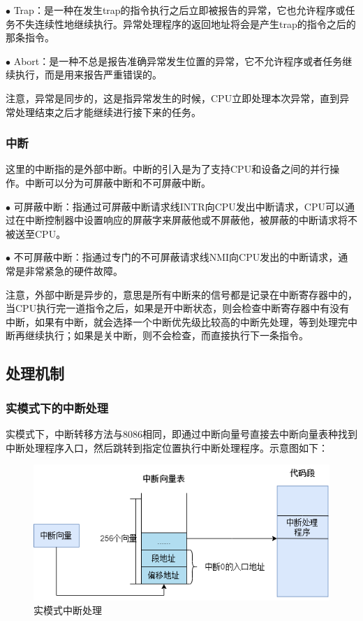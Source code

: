 \documentclass[UTF8,12pt]{ctexart}
\begin{document}
    $\bullet$ Trap：是一种在发生trap的指令执行之后立即被报告的异常，它也允许程序或任务不失连续性地继续执行。异常处理程序的返回地址将会是产生trap的指令之后的那条指令。
    
    $\bullet$ Abort：是一种不总是报告准确异常发生位置的异常，它不允许程序或者任务继续执行，而是用来报告严重错误的。
    
    注意，异常是同步的，这是指异常发生的时候，CPU立即处理本次异常，直到异常处理结束之后才能继续进行接下来的任务。
    
    \subsubsection{中断}
    这里的中断指的是外部中断。中断的引入是为了支持CPU和设备之间的并行操作。中断可以分为可屏蔽中断和不可屏蔽中断。
    
    $\bullet$ 可屏蔽中断：指通过可屏蔽中断请求线INTR向CPU发出中断请求，CPU可以通过在中断控制器中设置响应的屏蔽字来屏蔽他或不屏蔽他，被屏蔽的中断请求将不被送至CPU。
    
    $\bullet$ 不可屏蔽中断：指通过专门的不可屏蔽请求线NMI向CPU发出的中断请求，通常是非常紧急的硬件故障。
    
    注意，外部中断是异步的，意思是所有中断来的信号都是记录在中断寄存器中的，当CPU执行完一道指令之后，如果是开中断状态，则会检查中断寄存器中有没有中断，如果有中断，就会选择一个中断优先级比较高的中断先处理，等到处理完中断再继续执行；如果是关中断，则不会检查，而直接执行下一条指令。
    
    \subsection{处理机制}
    \subsubsection{实模式下的中断处理}
    实模式下，中断转移方法与8086相同，即通过中断向量号直接去中断向量表种找到中断处理程序入口，然后跳转到指定位置执行中断处理程序。示意图如下：
    \begin{figure}[H]
        \centering
        \includegraphics[width=12cm]{images/实模式处理.png}
        \caption{实模式中断处理}
        \label{实模式中断处理}
    \end{figure}
    
\end{document}
